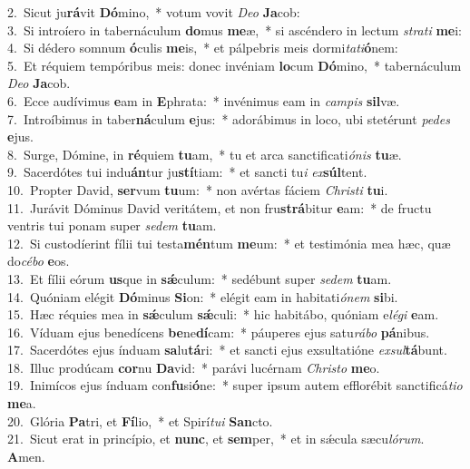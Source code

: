 {2.~}Sicut ju\textbf{rá}vit \textbf{Dó}mino,~* votum vovit \textit{De}\textit{o} \textbf{Ja}cob:\\
{3.~}Si introíero in tabernáculum \textbf{do}mus \textbf{me}æ,~* si ascéndero in lectum \textit{stra}\textit{ti} \textbf{me}i:\\
{4.~}Si dédero somnum \textbf{ó}culis \textbf{me}is,~* et pálpebris meis dormi\textit{ta}\textit{ti}\textbf{ó}nem:\\
{5.~}Et réquiem tempóribus meis: donec invéniam \textbf{lo}cum \textbf{Dó}mino,~* tabernáculum \textit{De}\textit{o} \textbf{Ja}cob.\\
{6.~}Ecce audívimus \textbf{e}am in \textbf{E}phrata:~* invénimus eam in \textit{cam}\textit{pis} \textbf{sil}væ.\\
{7.~}Introíbimus in taber\textbf{ná}culum \textbf{e}jus:~* adorábimus in loco, ubi stetérunt \textit{pe}\textit{des} \textbf{e}jus.\\
{8.~}Surge, Dómine, in \textbf{ré}quiem \textbf{tu}am,~* tu et arca sanctificati\textit{ó}\textit{nis} \textbf{tu}æ.\\
{9.~}Sacerdótes tui indu\textbf{án}tur ju\textbf{stí}tiam:~* et sancti tu\textit{i} \textit{ex}\textbf{súl}tent.\\
{10.~}Propter David, \textbf{ser}vum \textbf{tu}um:~* non avértas fáciem \textit{Chri}\textit{sti} \textbf{tu}i.\\
{11.~}Jurávit Dóminus David veritátem, et non fru\textbf{strá}bitur \textbf{e}am:~* de fructu ventris tui ponam super \textit{se}\textit{dem} \textbf{tu}am.\\
{12.~}Si custodíerint fílii tui testa\textbf{mén}tum \textbf{me}um:~* et testimónia mea hæc, quæ do\textit{cé}\textit{bo} \textbf{e}os.\\
{13.~}Et fílii eórum \textbf{us}que in \textbf{sǽ}culum:~* sedébunt super \textit{se}\textit{dem} \textbf{tu}am.\\
{14.~}Quóniam elégit \textbf{Dó}minus \textbf{Si}on:~* elégit eam in habitati\textit{ó}\textit{nem} \textbf{si}bi.\\
{15.~}Hæc réquies mea in \textbf{sǽ}culum \textbf{sǽ}culi:~* hic habitábo, quóniam e\textit{lé}\textit{gi} \textbf{e}am.\\
{16.~}Víduam ejus benedícens \textbf{be}ne\textbf{dí}cam:~* páuperes ejus satu\textit{rá}\textit{bo} \textbf{pá}nibus.\\
{17.~}Sacerdótes ejus índuam \textbf{sa}lu\textbf{tá}ri:~* et sancti ejus exsultatióne \textit{ex}\textit{sul}\textbf{tá}bunt.\\
{18.~}Illuc prodúcam \textbf{cor}nu \textbf{Da}vid:~* parávi lucérnam \textit{Chri}\textit{sto} \textbf{me}o.\\
{19.~}Inimícos ejus índuam con\textbf{fu}si\textbf{ó}ne:~* super ipsum autem efflorébit sanctificá\textit{ti}\textit{o} \textbf{me}a.\\
{20.~}Glória \textbf{Pa}tri, et \textbf{Fí}lio,~* et Spirí\textit{tu}\textit{i} \textbf{San}cto.\\
{21.~}Sicut erat in princípio, et \textbf{nunc}, et \textbf{sem}per,~* et in sǽcula sæcu\textit{ló}\textit{rum}. \textbf{A}men.\\
